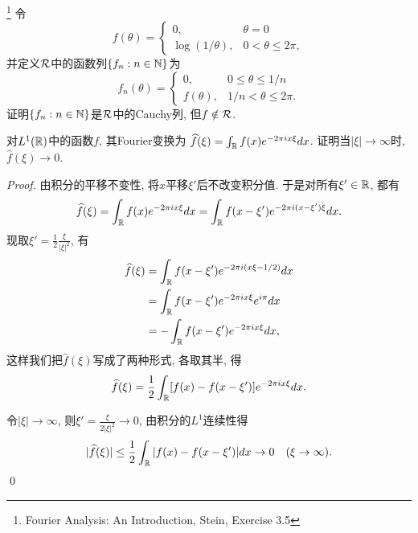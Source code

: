 \begin{example}\footnote{Fourier Analysis: An Introduction, Stein, Exercise 3.5}
    令
    $$f(\theta) = \begin{cases}
        0, & \theta = 0 \\
        \log(1/\theta), & 0 < \theta \leq 2\pi,
    \end{cases}$$
    并定义$\mathcal{R}$中的函数列$\{f_n: n \in \mathbb{N}\}$为
    $$f_n(\theta) = \begin{cases}
        0,         & 0 \leq \theta \leq 1/n \\
        f(\theta), & 1/n < \theta \leq 2\pi.
    \end{cases}$$
    证明$\{f_n: n \in \mathbb{N}\}$是$\mathcal{R}$中的Cauchy列, 但$f \notin \mathcal{R}$. 
\end{example}

\begin{example}[~(黎曼-勒贝格引理)]
    对$L^1(\mathbb{R})$中的函数$f$, 其Fourier变换为
    $\widehat{f}(\xi) = \int_{\mathbb{R}} f(x)e^{-2\pi i x\xi}dx$.
    证明当$|\xi| \to \infty$时, $\hat{f}(\xi) \to 0$.
\end{example}
\begin{proof}

    由积分的平移不变性, 将$x$平移$\xi'$后不改变积分值. 于是对所有$\xi' \in \mathbb{R}$, 都有 
    $$\widehat{f}(\xi) = \int_{\mathbb{R}} f(x)e^{-2\pi ix\xi}dx 
    = \int_{\mathbb{R}} f(x-\xi')e^{-2\pi i(x-\xi')\xi}dx.$$
    现取$\xi' = \frac{1}{2}\frac{\xi}{|\xi|^2}$, 有
    \begin{align*}
    \widehat{f}(\xi) &= \int_{\mathbb{R}} f(x-\xi')e^{-2\pi i (x\xi - 1/2)}dx \\
    &= \int_{\mathbb{R}} f(x-\xi')e^{-2\pi i x\xi}e^{i\pi}dx \\
    &= -\int_{\mathbb{R}} f(x-\xi')e^{-2\pi i x\xi}dx, 
    \end{align*}
    这样我们把$\hat{f}(\xi)$写成了两种形式, 各取其半, 得 
    $$\widehat{f}(\xi) = \frac{1}{2} \int_{\mathbb{R}}[f(x)-f(x-\xi')]e^{-2\pi i x\xi}dx.$$
    
    令$|\xi| \to \infty$, 则$\xi' = \frac{\xi}{2|\xi|^2} \to 0$,
    由积分的$L^1$连续性得
    $$|\widehat{f}(\xi)| \leq \frac{1}{2}
     \int_{\mathbb{R}}|f(x)-f(x-\xi')|dx\to 0 \quad (\xi \to \infty).$$ \qed 
\end{proof}


